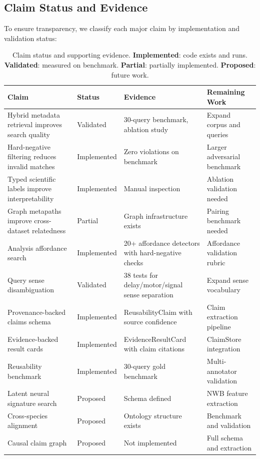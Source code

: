 \documentclass{article}
\theoremstyle{definition}
\begin{document}
\subsection{Claim Status and Evidence}

To ensure transparency, we classify each major claim by implementation and validation status:

\begin{table}[t]
\centering
\small
\caption{Claim status and supporting evidence. \textbf{Implemented}: code exists and runs. \textbf{Validated}: measured on benchmark. \textbf{Partial}: partially implemented. \textbf{Proposed}: future work.}
\label{tab:claim-status}
\begin{tabular}{p{4.5cm}lp{3.5cm}p{3cm}}
\toprule
\textbf{Claim} & \textbf{Status} & \textbf{Evidence} & \textbf{Remaining Work} \\
\midrule
Hybrid metadata retrieval improves search quality & Validated & 30-query benchmark, ablation study & Expand corpus and queries \\
Hard-negative filtering reduces invalid matches & Implemented & Zero violations on benchmark & Larger adversarial benchmark \\
Typed scientific labels improve interpretability & Implemented & Manual inspection & Ablation validation needed \\
Graph metapaths improve cross-dataset relatedness & Partial & Graph infrastructure exists & Pairing benchmark needed \\
Analysis affordance search & Implemented & 20+ affordance detectors with hard-negative checks & Affordance validation rubric \\
Query sense disambiguation & Validated & 38 tests for delay/motor/signal sense separation & Expand sense vocabulary \\
Provenance-backed claims schema & Implemented & ReusabilityClaim with source confidence & Claim extraction pipeline \\
Evidence-backed result cards & Implemented & EvidenceResultCard with claim citations & ClaimStore integration \\
Reusability benchmark & Implemented & 30-query gold benchmark & Multi-annotator validation \\
Latent neural signature search & Proposed & Schema defined & NWB feature extraction \\
Cross-species alignment & Proposed & Ontology structure exists & Benchmark and validation \\
Causal claim graph & Proposed & Not implemented & Full schema and extraction \\
\bottomrule
\end{tabular}
\end{table}
\end{document}
